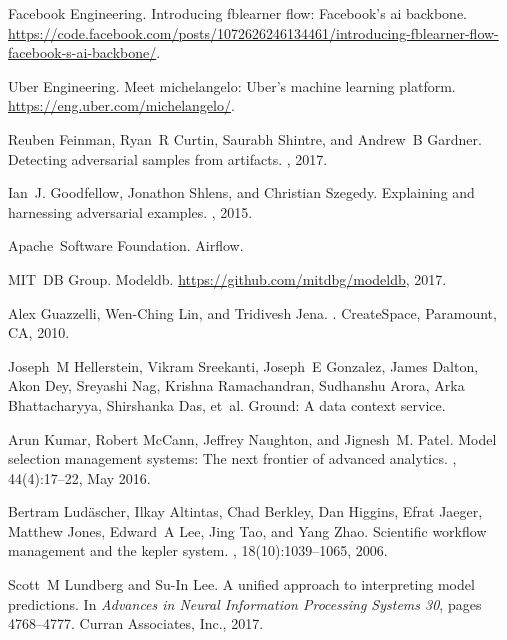 \documentclass[11pt]{article}
\begin{document}
\begin{thebibliography}{10}
\begin{small}
Facebook Engineering.
\newblock Introducing fblearner flow: Facebook's ai backbone.
\newblock
  \url{https://code.facebook.com/posts/1072626246134461/introducing-fblearner-flow-facebook-s-ai-backbone/}.

Uber Engineering.
\newblock Meet michelangelo: Uber's machine learning platform.
\newblock \url{https://eng.uber.com/michelangelo/}.

Reuben Feinman, Ryan~R Curtin, Saurabh Shintre, and Andrew~B Gardner.
\newblock Detecting adversarial samples from artifacts.
, 2017.

Ian~J. Goodfellow, Jonathon Shlens, and Christian Szegedy.
\newblock Explaining and harnessing adversarial examples.
, 2015.

Apache~Software Foundation.
\newblock Airflow.

MIT~DB Group.
\newblock Modeldb.
\newblock \url{https://github.com/mitdbg/modeldb}, 2017.

Alex Guazzelli, Wen-Ching Lin, and Tridivesh Jena.
.
\newblock CreateSpace, Paramount, CA, 2010.

Joseph~M Hellerstein, Vikram Sreekanti, Joseph~E Gonzalez, James Dalton, Akon
  Dey, Sreyashi Nag, Krishna Ramachandran, Sudhanshu Arora, Arka Bhattacharyya,
  Shirshanka Das, et~al.
\newblock Ground: A data context service.

Arun Kumar, Robert McCann, Jeffrey Naughton, and Jignesh~M. Patel.
\newblock Model selection management systems: The next frontier of advanced
  analytics.
, 44(4):17--22, May 2016.

Bertram Lud{\"a}scher, Ilkay Altintas, Chad Berkley, Dan Higgins, Efrat Jaeger,
  Matthew Jones, Edward~A Lee, Jing Tao, and Yang Zhao.
\newblock Scientific workflow management and the kepler system.
,
  18(10):1039--1065, 2006.

Scott~M Lundberg and Su-In Lee.
\newblock A unified approach to interpreting model predictions.
\newblock In {\em Advances in Neural Information Processing Systems 30}, pages
  4768--4777. Curran Associates, Inc., 2017.


\end{small}
\end{thebibliography}
\end{document}
